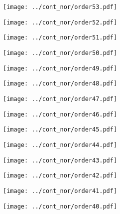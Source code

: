 \documentclass{article}
\begin{document}
\begin{figure}[H]
    \centering
    \texttt{[image: ../cont\_nor/order53.pdf]}
\end{figure}
\begin{figure}[H]
    \centering
    \texttt{[image: ../cont\_nor/order52.pdf]}
\end{figure}
\begin{figure}[H]
    \centering
    \texttt{[image: ../cont\_nor/order51.pdf]}
\end{figure}
\begin{figure}[H]
    \centering
    \texttt{[image: ../cont\_nor/order50.pdf]}
\end{figure}
\begin{figure}[H]
    \centering
    \texttt{[image: ../cont\_nor/order49.pdf]}
\end{figure}
\begin{figure}[H]
    \centering
    \texttt{[image: ../cont\_nor/order48.pdf]}
\end{figure}
\begin{figure}[H]
    \centering
    \texttt{[image: ../cont\_nor/order47.pdf]}
\end{figure}
\begin{figure}[H]
    \centering
    \texttt{[image: ../cont\_nor/order46.pdf]}
\end{figure}
\begin{figure}[H]
    \centering
    \texttt{[image: ../cont\_nor/order45.pdf]}
\end{figure}
\begin{figure}[H]
    \centering
    \texttt{[image: ../cont\_nor/order44.pdf]}
\end{figure}
\begin{figure}[H]
    \centering
    \texttt{[image: ../cont\_nor/order43.pdf]}
\end{figure}
\begin{figure}[H]
    \centering
    \texttt{[image: ../cont\_nor/order42.pdf]}
\end{figure}
\begin{figure}[H]
    \centering
    \texttt{[image: ../cont\_nor/order41.pdf]}
\end{figure}
\begin{figure}[H]
    \centering
    \texttt{[image: ../cont\_nor/order40.pdf]}
\end{figure}
\end{document}
